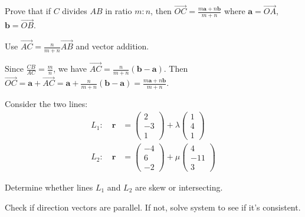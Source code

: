 \vspace{1em}

\begin{problem}
Prove that if $C$ divides $AB$ in ratio $m:n$, then $\overrightarrow{OC} = \frac{m\mathbf{a} + n\mathbf{b}}{m+n}$ where $\mathbf{a} = \overrightarrow{OA}$, $\mathbf{b} = \overrightarrow{OB}$.
\end{problem}

\begin{hint}
Use $\overrightarrow{AC} = \frac{n}{m+n}\overrightarrow{AB}$ and vector addition.
\end{hint}

\begin{solution}[Sketch]
Since $\frac{CB}{AC} = \frac{m}{n}$, we have $\overrightarrow{AC} = \frac{n}{m+n}(\mathbf{b} - \mathbf{a})$. Then $\overrightarrow{OC} = \mathbf{a} + \overrightarrow{AC} = \mathbf{a} + \frac{n}{m+n}(\mathbf{b} - \mathbf{a}) = \frac{m\mathbf{a} + n\mathbf{b}}{m+n}$.
\end{solution}

\vspace{1em}

\begin{problem}
Consider the two lines:
\begin{align*}
L_1: \quad \mathbf{r} &= \begin{pmatrix} 2 \\ -3 \\ 1 \end{pmatrix} + \lambda \begin{pmatrix} 1 \\ 4 \\ 1 \end{pmatrix} \\
L_2: \quad \mathbf{r} &= \begin{pmatrix} -4 \\ 6 \\ -2 \end{pmatrix} + \mu \begin{pmatrix} 4 \\ -11 \\ 3 \end{pmatrix}
\end{align*}

Determine whether lines $L_1$ and $L_2$ are skew or intersecting.
\end{problem}

\begin{hint}
Check if direction vectors are parallel. If not, solve system to see if it's consistent.
\end{hint}

